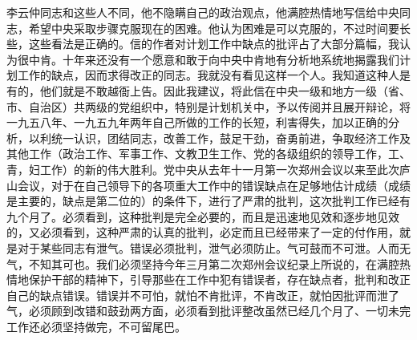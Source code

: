 李云仲同志和这些人不同，他不隐瞒自己的政治观点，他满腔热情地写信给中央同志，希望中央采取步骤克服现在的困难。他认为困难是可以克服的，不过时间要长些，这些看法是正确的。信的作者对计划工作中缺点的批评占了大部分篇幅，我认为很中肯。十年来还没有一个愿意和敢于向中央中肯地有分析地系统地揭露我们计划工作的缺点，因而求得改正的同志。我就没有看见这样一个人。我知道这种人是有的，他们就是不敢越衙上告。因此我建议，将此信在中央一级和地方一级（省、市、自治区）共两级的党组织中，特别是计划机关中，予以传阅并且展开辩论，将一九五八年、一九五九年两年自己所做的工作的长短，利害得失，加以正确的分析，以利统一认识，团结同志，改善工作，鼓足干劲，奋勇前进，争取经济工作及其他工作（政治工作、军事工作、文教卫生工作、党的各级组织的领导工作，工、青，妇工作）的新的伟大胜利。党中央从去年十一月第一次郑州会议以来至此次庐山会议，对于在自己领导下的各项重大工作中的错误缺点在足够地估计成绩（成绩是主要的，缺点是第二位的）的条件下，进行了严肃的批判，这次批判工作已经有九个月了。必须看到，这种批判是完全必要的，而且是迅速地见效和逐步地见效的，又必须看到，这种严肃的认真的批判，必定而且已经带来了一定的付作用，就是对于某些同志有泄气。错误必须批判，泄气必须防止。气可鼓而不可泄。人而无气，不知其可也。我们必须坚持今年三月第二次郑州会议纪录上所说的，在满腔热情地保护干部的精神下，引导那些在工作中犯有错误者，存在缺点者，批判和改正自己的缺点错误。错误并不可怕，就怕不肯批评，不肯改正，就怕因批评而泄了气，必须顾到改错和鼓劲两方面，必须看到批评整改虽然已经几个月了、一切未完工作还必须坚持做完，不可留尾巴。


